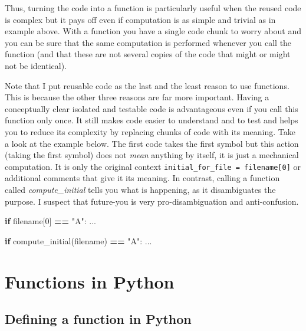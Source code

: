 \documentclass[
]{book}
\newenvironment{Shaded}{\begin{snugshade}}{\end{snugshade}}
\newcommand{\ControlFlowTok}[1]{\textcolor[rgb]{0.13,0.29,0.53}{\textbf{#1}}}
\newcommand{\DecValTok}[1]{\textcolor[rgb]{0.00,0.00,0.81}{#1}}
\newcommand{\NormalTok}[1]{#1}
\newcommand{\OperatorTok}[1]{\textcolor[rgb]{0.81,0.36,0.00}{\textbf{#1}}}
\newcommand{\StringTok}[1]{\textcolor[rgb]{0.31,0.60,0.02}{#1}}
\begin{document}
Thus, turning the code into a function is particularly useful when the reused code is complex but it pays off even if computation is as simple and trivial as in example above. With a function you have a single code chunk to worry about and you can be sure that the same computation is performed whenever you call the function (and that these are not several copies of the code that might or might not be identical).

Note that I put reusable code as the last and the least reason to use functions. This is because the other three reasons are far more important. Having a conceptually clear isolated and testable code is advantageous even if you call this function only once. It still makes code easier to understand and to test and helps you to reduce its complexity by replacing chunks of code with its meaning. Take a look at the example below. The first code takes the first symbol but this action (taking the first symbol) does not \emph{mean} anything by itself, it is just a mechanical computation. It is only the original context \texttt{initial\_for\_file\ =\ filename{[}0{]}} or additional comments that give it its meaning. In contrast, calling a function called \emph{compute\_initial} tells you what is happening, as it disambiguates the purpose. I suspect that future-you is very pro-disambiguation and anti-confusion.

\begin{Shaded}
\begin{Highlighting}[]
\ControlFlowTok{if}\NormalTok{ filename[}\DecValTok{0}\NormalTok{] }\OperatorTok{==} \StringTok{"A"}\NormalTok{:}
\NormalTok{    ...}
    
\ControlFlowTok{if}\NormalTok{ compute\_initial(filename) }\OperatorTok{==} \StringTok{"A"}\NormalTok{:}
\NormalTok{    ...}
\end{Highlighting}
\end{Shaded}

\hypertarget{functions-in-python}{%
\section{Functions in Python}\label{functions-in-python}}

\hypertarget{defining-a-function-in-python}{%
\subsection{Defining a function in Python}\label{defining-a-function-in-python}}
\end{document}
